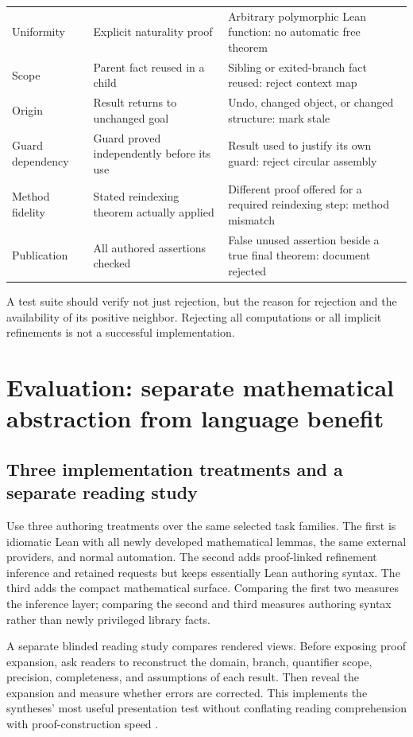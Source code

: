 \documentclass[11pt,a4paper]{article}
\theoremstyle{plain}
\theoremstyle{definition}
\begin{document}
\begin{center}
\begin{longtable}{@{}L{34mm}L{55mm}L{62mm}@{}}
Uniformity & Explicit naturality proof & Arbitrary polymorphic Lean function: no automatic free theorem\\
Scope & Parent fact reused in a child & Sibling or exited-branch fact reused: reject context map\\
Origin & Result returns to unchanged goal & Undo, changed object, or changed structure: mark stale\\
Guard dependency & Guard proved independently before its use & Result used to justify its own guard: reject circular assembly\\
Method fidelity & Stated reindexing theorem actually applied & Different proof offered for a required reindexing step: method mismatch\\
Publication & All authored assertions checked & False unused assertion beside a true final theorem: document rejected\\
\bottomrule
\end{longtable}
\end{center}
A test suite should verify not just rejection, but the reason for rejection and the availability of its positive neighbor. Rejecting all computations or all implicit refinements is not a successful implementation.

\section{Evaluation: separate mathematical abstraction from language benefit}\label{sec:evaluation}

\subsection{Three implementation treatments and a separate reading study}
Use three authoring treatments over the same selected task families. The first is idiomatic Lean with all newly developed mathematical lemmas, the same external providers, and normal automation. The second adds proof-linked refinement inference and retained requests but keeps essentially Lean authoring syntax. The third adds the compact mathematical surface. Comparing the first two measures the inference layer; comparing the second and third measures authoring syntax rather than newly privileged library facts.

A separate blinded reading study compares rendered views. Before exposing proof expansion, ask readers to reconstruct the domain, branch, quantifier scope, precision, completeness, and assumptions of each result. Then reveal the expansion and measure whether errors are corrected. This implements the syntheses' most useful presentation test without conflating reading comprehension with proof-construction speed \cite{synA,synB}.
\end{document}
